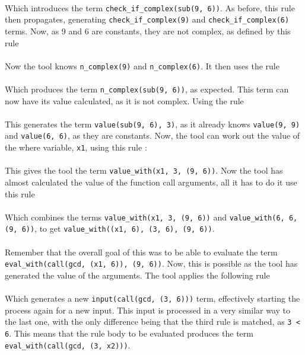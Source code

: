 
\mbox{} \\
Which introduces the term \lstinline{check_if_complex(sub(9, 6))}. As before, this rule then propagates, generating \lstinline{check_if_complex(9)} and \lstinline{check_if_complex(6)} terms. Now, as 9 and 6 are constants, they are not complex, as defined by this rule \\ %


\mbox{} \\
Now the tool knows \lstinline{n_complex(9)} and \lstinline{n_complex(6)}. It then uses the rule \\ %


\mbox{} \\
Which produces the term \lstinline{n_complex(sub(9, 6))}, as expected. This term can now have its value calculated, as it is not complex. Using the rule \\ %


\mbox{} \\
This generates the term \lstinline{value(sub(9, 6), 3)}, as it already knows \lstinline{value(9, 9)} and \lstinline{value(6, 6)}, as they are constants. Now, the tool can work out the value of the where variable, \lstinline{x1}, using this rule : \\


\mbox{} \\
This gives the tool the term \lstinline{value_with(x1, 3, (9, 6))}. Now the tool has almost calculated the value of the function call arguments, all it has to do it use this rule \\%


\mbox{} \\
Which combines the terms \lstinline{value_with(x1, 3, (9, 6))} and \lstinline{value_with(6, 6, (9, 6))}, to get \lstinline{value_with((x1, 6), (3, 6), (9, 6))}. \\ \\ %
Remember that the overall goal of this was to be able to evaluate the term \lstinline{eval_with(call(gcd, (x1, 6)), (9, 6))}. Now, this is possible as the tool has generated the value of the arguments. The tool applies the following rule \\ %


\mbox{} \\
Which generates a new \lstinline{input(call(gcd, (3, 6)))} term, effectively starting the process again for a new input. This input is processed in a very similar way to the last one, with the only difference being that the third rule is matched, as \lstinline{3 < 6}. This means that the rule body to be evaluated produces the term \lstinline{eval_with(call(gcd, (3, x2)))}. 

\pagebreak
%
%
